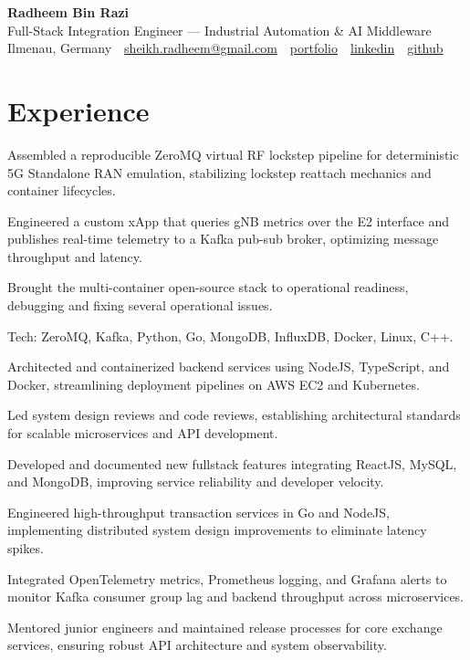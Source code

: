 \documentclass[10pt,a4paper]{resume}
\makeatletter
\newcommand{\Portfolio}{https://radheem.github.io/my-cv}
\newcommand{\PortfolioText}{portfolio}
\newcommand{\GitHub}{https://github.com/radheem}
\newcommand{\LinkedIn}{https://www.linkedin.com/in/radheem-razi}
\newcommand{\Email}{sheikh.radheem@gmail.com}
\makeatother
\begin{document}
\begin{center}
  {\huge\bfseries Radheem Bin Razi}\\[3pt]
  {\large Full-Stack Integration Engineer — Industrial Automation \& AI Middleware}\\[6pt]
  \small
  Ilmenau, Germany \,\textbar\,
  \href{mailto:\Email}{\Email} \,\textbar\,
  \href{\Portfolio}{\PortfolioText} \,\textbar\,
  \href{\LinkedIn}{linkedin} \,\textbar\,
  \href{\GitHub}{github}
\end{center}
\vspace{2pt}

\section{Experience}

\bullets
  \item Assembled a reproducible ZeroMQ virtual RF lockstep pipeline for deterministic 5G Standalone RAN emulation, stabilizing lockstep reattach mechanics and container lifecycles.
  \item Engineered a custom xApp that queries gNB metrics over the E2 interface and publishes real-time telemetry to a Kafka pub-sub broker, optimizing message throughput and latency.
  \item Brought the multi-container open-source stack to operational readiness, debugging and fixing several operational issues.
  \item Tech: ZeroMQ, Kafka, Python, Go, MongoDB, InfluxDB, Docker, Linux, C++.
\bulletsend
\vspace{1.5pt}
\bullets
  \item Architected and containerized backend services using NodeJS, TypeScript, and Docker, streamlining deployment pipelines on AWS EC2 and Kubernetes.
  \item Led system design reviews and code reviews, establishing architectural standards for scalable microservices and API development.
  \item Developed and documented new fullstack features integrating ReactJS, MySQL, and MongoDB, improving service reliability and developer velocity.
\bulletsend
\vspace{1.5pt}
\bullets
  \item Engineered high-throughput transaction services in Go and NodeJS, implementing distributed system design improvements to eliminate latency spikes.
  \item Integrated OpenTelemetry metrics, Prometheus logging, and Grafana alerts to monitor Kafka consumer group lag and backend throughput across microservices.
  \item Mentored junior engineers and maintained release processes for core exchange services, ensuring robust API architecture and system observability.
\bulletsend
\vspace{1.5pt}
\end{document}
